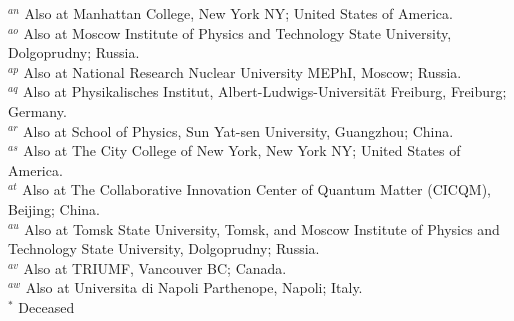 \begin{flushleft}
$^{an}$ Also at Manhattan College, New York NY; United States of America.\\
$^{ao}$ Also at Moscow Institute of Physics and Technology State University, Dolgoprudny; Russia.\\
$^{ap}$ Also at National Research Nuclear University MEPhI, Moscow; Russia.\\
$^{aq}$ Also at Physikalisches Institut, Albert-Ludwigs-Universit\"{a}t Freiburg, Freiburg; Germany.\\
$^{ar}$ Also at School of Physics, Sun Yat-sen University, Guangzhou; China.\\
$^{as}$ Also at The City College of New York, New York NY; United States of America.\\
$^{at}$ Also at The Collaborative Innovation Center of Quantum Matter (CICQM), Beijing; China.\\
$^{au}$ Also at Tomsk State University, Tomsk, and Moscow Institute of Physics and Technology State University, Dolgoprudny; Russia.\\
$^{av}$ Also at TRIUMF, Vancouver BC; Canada.\\
$^{aw}$ Also at Universita di Napoli Parthenope, Napoli; Italy.\\
$^{*}$ Deceased

\end{flushleft}

